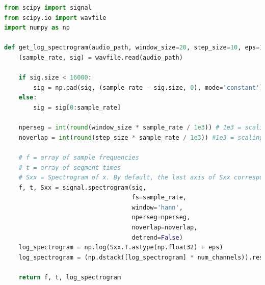 \documentclass{article}
\theoremstyle{definition}
\theoremstyle{remark}
\begin{document}
\begin{lstlisting}[language=Python, caption=Get log spectrogram code, label=code:log_spectrograms]
from scipy import signal
from scipy.io import wavfile
import numpy as np

def get_log_spectrogram(audio_path, window_size=20, step_size=10, eps=1e-10, num_channels=1):
    (sample_rate, sig) = wavfile.read(audio_path)

    if sig.size < 16000:
        sig = np.pad(sig, (sample_rate - sig.size, 0), mode='constant')
    else:
        sig = sig[0:sample_rate]

    nperseg = int(round(window_size * sample_rate / 1e3)) # 1e3 = scaling
    noverlap = int(round(step_size * sample_rate / 1e3)) #1e3 = scaling

    # f = array of sample frequencies
    # t = array of segment times
    # Sxx = Spectrogram of x. By default, the last axis of Sxx corresponds to the segment times.
    f, t, Sxx = signal.spectrogram(sig,
                                   fs=sample_rate,
                                   window='hann',
                                   nperseg=nperseg,
                                   noverlap=noverlap,
                                   detrend=False)
    log_spectrogram = np.log(Sxx.T.astype(np.float32) + eps)
    log_spectrogram = (np.dstack([log_spectrogram] * num_channels)).reshape(99, 161, -1)  

    return f, t, log_spectrogram
\end{lstlisting}
\end{document}
